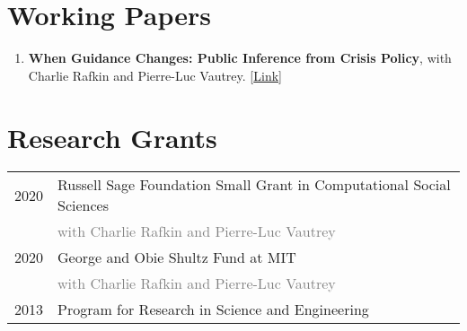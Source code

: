 \documentclass[12pt]{article}
\begin{document}
\section*{Working Papers}
\label{sec:working_papers}
\begin{enumerate}[label=\arabic*.]
\item \textbf{When Guidance Changes: Public Inference from Crisis Policy}, with Charlie Rafkin and Pierre-Luc Vautrey. [\href{https://www.dropbox.com/work/Public%20COVID?preview=rsv_covid_changing.pdf}{Link}]


\end{enumerate}

\section*{Research Grants}
\label{sec:research_grants}
\begin{tabular}{p{\datecolumn} l}
2020 & Russell Sage Foundation Small Grant in Computational Social Sciences \\
     & \textcolor{gray}{with Charlie Rafkin and Pierre-Luc Vautrey} \\
2020 & George and Obie Shultz Fund at MIT \\
     & \textcolor{gray}{with Charlie Rafkin and Pierre-Luc Vautrey} \\
2013 & Program for Research in Science and Engineering
\end{tabular}
\end{document}
